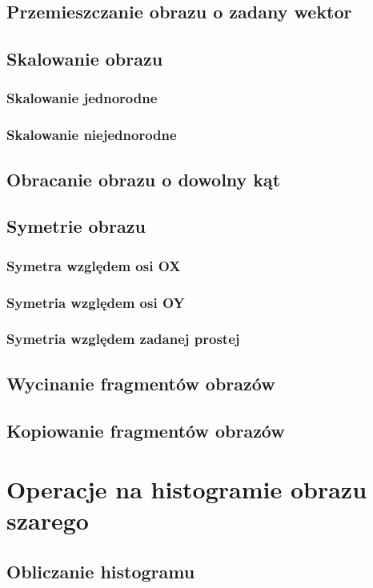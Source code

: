 \documentclass[a4paper,12pt, titlepage]{report}
\begin{document}
\section{Przemieszczanie obrazu o zadany wektor}
\section{Skalowanie obrazu}
\subsection{Skalowanie jednorodne}
\subsection{Skalowanie niejednorodne}
\section{Obracanie obrazu o dowolny kąt}
\section{Symetrie obrazu}
\subsection{Symetra względem osi OX}
\subsection{Symetria względem osi OY}
\subsection{Symetria względem zadanej prostej}
\section{Wycinanie fragmentów obrazów}
\section{Kopiowanie fragmentów obrazów}

\chapter{Operacje na histogramie obrazu szarego}
\section{Obliczanie histogramu}
\end{document}
